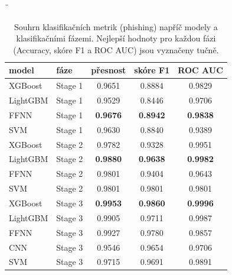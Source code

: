¨
\begin{table}[H]
\centering
\small
\begin{tabular}{|l|l|c|c|c|}
\hline
\textbf{model} & \textbf{fáze} & \textbf{přesnost} & \textbf{skóre F1} & \textbf{ROC AUC} \\
\hline
XGBoost  & Stage 1 & 0.9651          & 0.8884          & 0.9829          \\
LightGBM & Stage 1 & 0.9529          & 0.8446          & 0.9706          \\
FFNN     & Stage 1 & \textbf{0.9676} & \textbf{0.8942} & \textbf{0.9838} \\
SVM      & Stage 1 & 0.9630          & 0.8840          & 0.9389          \\
\hline
XGBoost  & Stage 2 & 0.9782           & 0.9328         & 0.9951  \\
LightGBM & Stage 2 & \textbf{0.9880} & \textbf{0.9638} &\textbf{0.9982}         \\
FFNN     & Stage 2 & 0.9801          & 0.9404          & 0.9643          \\
SVM      & Stage 2 & 0.9801          & 0.9801          & 0.9801          \\
\hline
XGBoost  & Stage 3 & \textbf{0.9953} & \textbf{0.9860} & \textbf{0.9996} \\
LightGBM & Stage 3 & 0.9905          & 0.9711          & 0.9987          \\
FFNN     & Stage 3 & 0.9927          & 0.9780          & 0.9857          \\
CNN      & Stage 3 & 0.9546          & 0.9654         & 0.9706             \\
SVM      & Stage 3 & 0.9715          & 0.9691          & 0.9891          \\
\hline
\end{tabular}
\caption{Souhrn klasifikačních metrik (phishing) napříč modely a klasifikačními fázemi. Nejlepší hodnoty pro každou fázi (Accuracy, skóre F1 a ROC AUC) jsou vyznačeny tučně.}
\label{tab:summary_phishing_stages}
\end{table}

